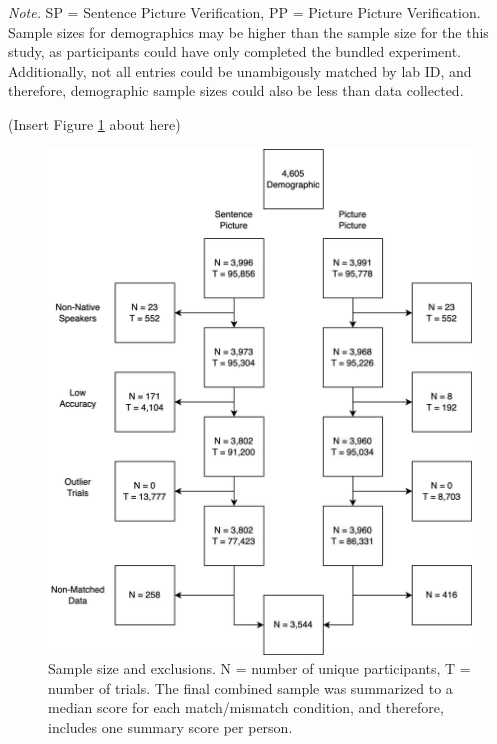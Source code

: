 \documentclass[
  man]{apa7}
\begin{document}
\begin{table}[tbp]
\begin{center}
\begin{threeparttable}
{}

\begin{tablenotes}[para]
\normalsize{\textit{Note.} SP = Sentence Picture Verification, PP = Picture Picture Verification. Sample sizes for demographics may be higher than the sample size for the this study, as participants could have only completed the bundled experiment. Additionally, not all entries could be unambigously matched by lab ID, and therefore, demographic sample sizes could also be less than data collected.}
\end{tablenotes}

\end{threeparttable}
\end{center}

\end{table}

(Insert Figure \ref{fig:sample-fig} about here)

\begin{figure}
\centering
\includegraphics{includes/fig/psa002_flow.drawio.png}
\caption{\label{fig:sample-fig}Sample size and exclusions. N = number of unique participants, T = number of trials. The final combined sample was summarized to a median score for each match/mismatch condition, and therefore, includes one summary score per person.}
\end{figure}
\end{document}
